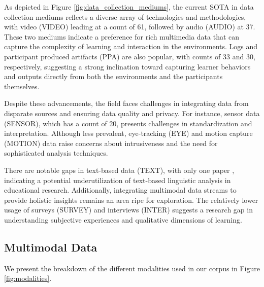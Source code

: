 \documentclass[manuscript,screen,review]{acmart}
\begin{document}
As depicted in Figure \ref{fig:data_collection_mediums}, the current SOTA in data collection mediums reflects a diverse array of technologies and methodologies, with video (VIDEO) leading at a count of 61, followed by audio (AUDIO) at 37. These two mediums indicate a preference for rich multimedia data that can capture the complexity of learning and interaction in the environments. Logs and participant produced artifacts (PPA) are also popular, with counts of 33 and 30, respectively, suggesting a strong inclination toward capturing learner behaviors and outputs directly from both the environments and the participants themselves.

Despite these advancements, the field faces challenges in integrating data from disparate sources and ensuring data quality and privacy. For instance, sensor data (SENSOR), which has a count of 20, presents challenges in standardization and interpretation. Although less prevalent, eye-tracking (EYE) and motion capture (MOTION) data raise concerns about intrusiveness and the need for sophisticated analysis techniques.

There are notable gaps in text-based data (TEXT), with only one paper \cite{666050348}, indicating a potential underutilization of text-based linguistic analysis in educational research. Additionally, integrating multimodal data streams to provide holistic insights remains an area ripe for exploration. The relatively lower usage of surveys (SURVEY) and interviews (INTER) suggests a research gap in understanding subjective experiences and qualitative dimensions of learning.


\subsection{Multimodal Data}
We present the breakdown of the different modalities used in our corpus in Figure \ref{fig:modalities}.
\end{document}
